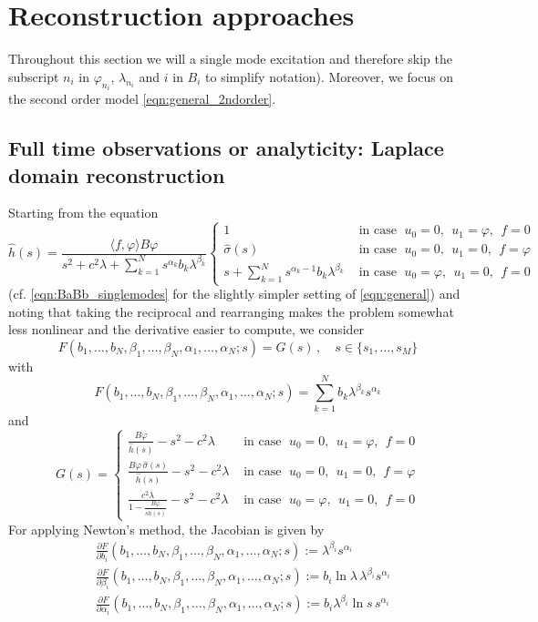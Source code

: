 \section{Reconstruction approaches}\label{sec:recon_meth}
Throughout this section we will a single mode excitation and therefore skip the subscript $n_i$ in $\varphi_{n_i}$, $\lambda_{n_i}$ and $i$ in $B_i$ to simplify notation). Moreover, we focus on the second order model \eqref{eqn:general_2ndorder}.

\subsection{Full time observations or analyticity: Laplace domain reconstruction}

Starting from the equation 
\[
\hat{h}(s)=\frac{\langle f,\varphi\rangle B\varphi}{
s^2+c^2\lambda+\sum_{k=1}^N s^{\alpha_k} b_{k}\lambda^{\beta_k}}
\begin{cases}
1 
&\mbox{ in case $\;u_0=0$, $\;u_1=\varphi$, $\;f=0$}\\
\hat{\sigma}(s)
&\mbox{ in case $\;u_0=0$, $\;u_1=0$, $\;f=\varphi$}\\
s+\sum_{k=1}^N s^{\alpha_k-1} b_{k}\lambda^{\beta_k}
&\mbox{ in case $\;u_0=\varphi$, $\;u_1=0$, $\;f=0$}
\end{cases}
\]
(cf. \eqref{eqn:BaBb_singlemodes} for the slightly simpler setting of \eqref{eqn:general}) and noting that taking the reciprocal and rearranging makes the problem somewhat less nonlinear and the derivative easier to compute, we consider 
\[
F(b_1,\ldots,b_N,\beta_1,\ldots,\beta_N,\alpha_1,\ldots,\alpha_N;s)
= G(s)\,, \quad s\in\{s_1,\ldots,s_M\}
\]
with 
\[
F(b_1,\ldots,b_N,\beta_1,\ldots,\beta_N,\alpha_1,\ldots,\alpha_N;s)
=\sum_{k=1}^N b_k \lambda^{\beta_k} s^{\alpha_k}
\]
and 
\[
G(s)=\begin{cases}
\frac{B\varphi}{\hat{h}(s)}-s^2-c^2\lambda
&\mbox{ in case $\;u_0=0$, $\;u_1=\varphi$, $\;f=0$}\\
\frac{B\varphi\, \hat{\sigma}(s)}{\hat{h}(s)}-s^2-c^2\lambda
&\mbox{ in case $\;u_0=0$, $\;u_1=0$, $\;f=\varphi$}\\
\frac{c^2\lambda}{1-\frac{B\varphi}{s\hat{h}(s)}}-s^2-c^2\lambda
&\mbox{ in case $\;u_0=\varphi$, $\;u_1=0$, $\;f=0$}
\end{cases}
\]
For applying Newton's method, the Jacobian is given by 
\[
\begin{aligned}
&\frac{\partial F}{\partial b_i}(b_1,\ldots,b_N,\beta_1,\ldots,\beta_N,\alpha_1,\ldots,\alpha_N;s):=
\lambda^{\beta_i} s^{\alpha_i}\\
&\frac{\partial F}{\partial \beta_i}(b_1,\ldots,b_N,\beta_1,\ldots,\beta_N,\alpha_1,\ldots,\alpha_N;s):=
b_i \ln \lambda\, \lambda^{\beta_i} s^{\alpha_i}\\
&\frac{\partial F}{\partial \alpha_i}(b_1,\ldots,b_N,\beta_1,\ldots,\beta_N,\alpha_1,\ldots,\alpha_N;s):=
b_i \lambda^{\beta_i} \ln s \, s^{\alpha_i}
\end{aligned}
\] 

